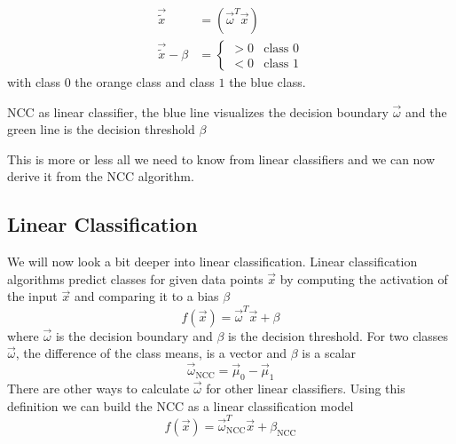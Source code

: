 \begin{minipage}{.45\textwidth}
  {
  \centering
\begin{align}
  \vec{\tilde{x}} &= \left(\vec{{\omega}}^T\vec{x}\right) \\
  \vec{\tilde{x}} - \beta &= \left\{\begin{matrix}
    > 0 & \text{class } 0 \\
    < 0 & \text{class } 1
  \end{matrix}\right.
\end{align}
  }
with class $0$ the orange class and class $1$ the blue class.
\end{minipage}
\begin{minipage}{.45\textwidth}
  \centering
  
  \caption{NCC as linear classifier, the blue line visualizes the decision boundary $\vec{\omega}$ and the green line is the decision threshold $\beta$}
  \label{fig:ncc_linear_classifier}
\end{minipage}
\vspace{1cm}

This is more or less all we need to know from linear classifiers and we can now derive it from the NCC algorithm.

\subsection{Linear Classification}
We will now look a bit deeper into linear classification.
Linear classification algorithms predict classes for given data points $\vec{x}$ by computing the activation of the input $\vec{x}$ and comparing it to a bias $\beta$
\begin{equation}
  f(\vec{x}) = \vec{\omega}^T\vec{x} + \beta
  \label{eq:linear_classification}
\end{equation}
where $\vec{\omega}$ is the decision boundary and $\beta$ is the decision threshold.
For two classes $\vec{\omega}$, the difference of the class means, is a vector and $\beta$ is a scalar
\begin{equation}
  \vec{\omega}_{\text{NCC}} = \vec{\mu}_0 - \vec{\mu}_1
\end{equation}
There are other ways to calculate $\vec{\omega}$ for other linear classifiers.
Using this definition we can build the NCC as a linear classification model
\begin{equation}
  f(\vec{x}) = \vec{\omega}_{\text{NCC}}^T\vec{x} + \beta_{\text{NCC}}
\end{equation}

